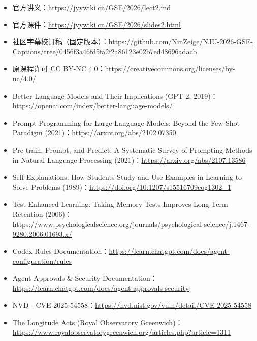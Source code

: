 \documentclass[UTF8,a4paper,11pt,fontset=fandol]{ctexart}
\begin{document}
\begin{itemize}

\item 官方讲义：\url{https://jyywiki.cn/GSE/2026/lect2.md}

\item 官方课件：\url{https://jyywiki.cn/GSE/2026/slides2.html}

\item 社区字幕校订稿（固定版本）：\url{https://github.com/NinZeige/NJU-2026-GSE-Captions/tree/0456f3a46fd5fa2f2a86123e02b7ed48696adacb}

\item 原课程许可 CC BY-NC 4.0：\url{https://creativecommons.org/licenses/by-nc/4.0/}

\item Better Language Models and Their Implications (GPT-2, 2019)：\url{https://openai.com/index/better-language-models/}

\item Prompt Programming for Large Language Models: Beyond the Few-Shot Paradigm (2021)：\url{https://arxiv.org/abs/2102.07350}

\item Pre-train, Prompt, and Predict: A Systematic Survey of Prompting Methods in Natural Language Processing (2021)：\url{https://arxiv.org/abs/2107.13586}

\item Self-Explanations: How Students Study and Use Examples in Learning to Solve Problems (1989)：\url{https://doi.org/10.1207/s15516709cog1302_1}

\item Test-Enhanced Learning: Taking Memory Tests Improves Long-Term Retention (2006)：\url{https://www.psychologicalscience.org/journals/psychological-science/j.1467-9280.2006.01693.x/}

\item Codex Rules Documentation：\url{https://learn.chatgpt.com/docs/agent-configuration/rules}

\item Agent Approvals \& Security Documentation：\url{https://learn.chatgpt.com/docs/agent-approvals-security}

\item NVD - CVE-2025-54558：\url{https://nvd.nist.gov/vuln/detail/CVE-2025-54558}

\item The Longitude Acts (Royal Observatory Greenwich)：\url{https://www.royalobservatorygreenwich.org/articles.php?article=1311}


\end{itemize}
\end{document}

